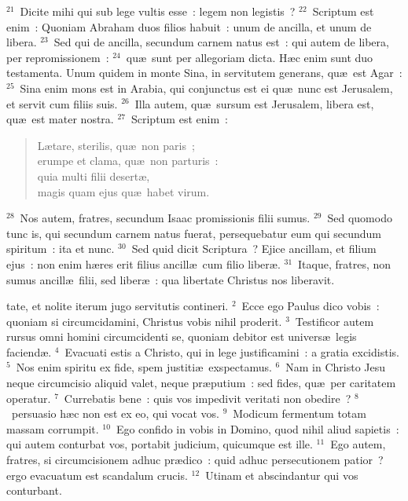 ${}^{21}$~Dicite mihi qui sub lege vultis esse~: legem non legistis~?
${}^{22}$~Scriptum est enim~: Quoniam Abraham duos filios habuit~: unum de ancilla, et unum de libera.
${}^{23}$~Sed qui de ancilla, secundum carnem natus est~: qui autem de libera, per repromissionem~:
${}^{24}$~qu\ae\ sunt per allegoriam dicta. H\ae c enim sunt duo testamenta. Unum quidem in monte Sina, in servitutem generans, qu\ae\ est Agar~:
${}^{25}$~Sina enim mons est in Arabia, qui conjunctus est ei qu\ae\ nunc est Jerusalem, et servit cum filiis suis.
${}^{26}$~Illa autem, qu\ae\ sursum est Jerusalem, libera est, qu\ae\ est mater nostra.
${}^{27}$~Scriptum est enim~: \begin{flushleft}\begin{verse}L\ae tare, sterilis, qu\ae\ non paris~;\\ erumpe et clama, qu\ae\ non parturis~:\\ quia multi filii desert\ae ,\\ magis quam ejus qu\ae\ habet virum.\end{verse}\end{flushleft}


${}^{28}$~Nos autem, fratres, secundum Isaac promissionis filii sumus.
${}^{29}$~Sed quomodo tunc is, qui secundum carnem natus fuerat, persequebatur eum qui secundum spiritum~: ita et nunc.
${}^{30}$~Sed quid dicit Scriptura~? Ejice ancillam, et filium ejus~: non enim h\ae res erit filius ancill\ae\ cum filio liber\ae .
${}^{31}$~Itaque, fratres, non sumus ancill\ae\ filii, sed liber\ae~: qua libertate Christus nos liberavit.

\bchapter
{}tate, et nolite iterum jugo servitutis contineri.
${}^{2}$~Ecce ego Paulus dico vobis~: quoniam si circumcidamini, Christus vobis nihil proderit.
${}^{3}$~Testificor autem rursus omni homini circumcidenti se, quoniam debitor est univers\ae\ legis faciend\ae .
${}^{4}$~Evacuati estis a Christo, qui in lege justificamini~: a gratia excidistis.
${}^{5}$~Nos enim spiritu ex fide, spem justiti\ae\ exspectamus.
${}^{6}$~Nam in Christo Jesu neque circumcisio aliquid valet, neque pr\ae putium~: sed fides, qu\ae\ per caritatem operatur.
${}^{7}$~Currebatis bene~: quis vos impedivit veritati non obedire~?
${}^{8}$~persuasio h\ae c non est ex eo, qui vocat vos.
${}^{9}$~Modicum fermentum totam massam corrumpit.
${}^{10}$~Ego confido in vobis in Domino, quod nihil aliud sapietis~: qui autem conturbat vos, portabit judicium, quicumque est ille.
${}^{11}$~Ego autem, fratres, si circumcisionem adhuc pr\ae dico~: quid adhuc persecutionem patior~? ergo evacuatum est scandalum crucis.
${}^{12}$~Utinam et abscindantur qui vos conturbant.


